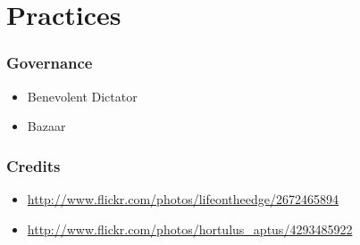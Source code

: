 \documentclass[18pt]{beamer}
\begin{document}
{ %
{}  %
\begin{frame}[plain]
\end{frame}
} %

\section{Practices}

\begin{frame}
\frametitle{Governance}
\begin{itemize}
\item Benevolent Dictator
\pause
\item Bazaar
\end{itemize}
\end{frame}


\begin{frame}
\frametitle{Credits}
\begin{itemize}
\item \url{http://www.flickr.com/photos/lifeontheedge/2672465894}
\item \url{http://www.flickr.com/photos/hortulus_aptus/4293485922}
\end{itemize}
\end{frame}
\end{document}
